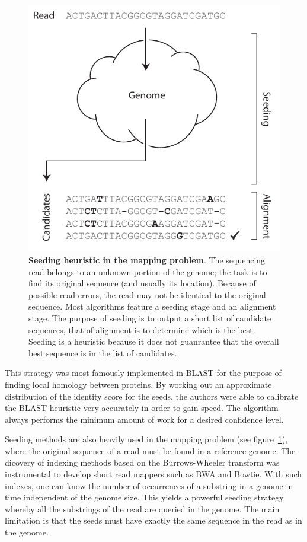 \documentclass{article}
\begin{document}
\begin{figure}[h]
\centering
\includegraphics[scale=.9]{cloud_genome.pdf}
\caption{\textbf{Seeding heuristic in the mapping problem}. The sequencing
read belongs to an unknown portion of the genome; the task is to find its
original sequence (and usually its location). Because of possible read
errors, the read may not be identical to the original sequence. Most
algorithms feature a seeding stage and an alignment stage. The purpose of
seeding is to output a short list of candidate sequences, that of
alignment is to determine which is the best. Seeding is a heuristic
because it does not guanrantee that the overall best sequence is in the
list of candidates.}
\label{fig:cloud_genome}
\end{figure}


This strategy was most famously implemented in BLAST for the purpose of
finding local homology between proteins. By working out an approximate
distribution of the identity score for the seeds, the authors were able to
calibrate the BLAST heuristic very accurately in order to gain speed. The
algorithm always performs the minimum amount of work for a desired
confidence level.

Seeding methods are also heavily used in the mapping problem (see
figure~\ref{fig:cloud_genome}), where the original sequence of a read must
be found in a reference genome. The dicovery of indexing methods based on
the Burrows-Wheeler transform was instrumental to develop short read
mappers such as BWA and Bowtie. With such indexes, one can know the number
of occurrences of a substring in a genome in time independent of the
genome size. This yields a powerful seeding strategy whereby all the
substrings of the read are queried in the genome. The main limitation is
that the seeds must have exactly the same sequence in the read as in the
genome.
\end{document}
